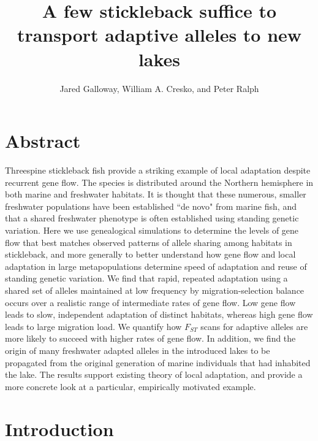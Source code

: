 \documentclass{article}
\begin{document}
\title{A few stickleback suffice to transport adaptive alleles to new lakes}
\author{Jared Galloway, William A. Cresko, and Peter Ralph}
\maketitle


\section*{Abstract}

Threespine stickleback fish provide a striking example of local adaptation despite recurrent gene flow.
The species is distributed around the Northern hemisphere in both marine and freshwater habitats.
It is thought that these numerous, smaller freshwater populations
have been established ``de novo" from marine fish,
and that a shared freshwater phenotype
is often established using standing genetic variation.
Here we use genealogical simulations to determine the levels of gene flow
that best matches observed patterns of allele sharing among habitats in stickleback, 
and more generally to better understand how gene flow and local adaptation in large metapopulations
determine speed of adaptation and reuse of standing genetic variation.
We find that rapid, repeated adaptation using a shared set of alleles maintained at low frequency by migration-selection balance occurs over a realistic range of intermediate rates of gene flow.
Low gene flow leads to slow, independent adaptation of distinct habitats, whereas high gene flow leads to large migration load.
We quantify how $F_{ST}$ scans for adaptive alleles are more likely to succeed with higher rates of gene flow.
In addition, we find the origin of many freshwater adapted alleles in the introduced lakes to be propagated from the original generation of marine individuals that had inhabited the lake.
The results support existing theory of local adaptation, and provide a more concrete look at a particular, empirically motivated example.  

\section*{Introduction}

%
\end{document}
